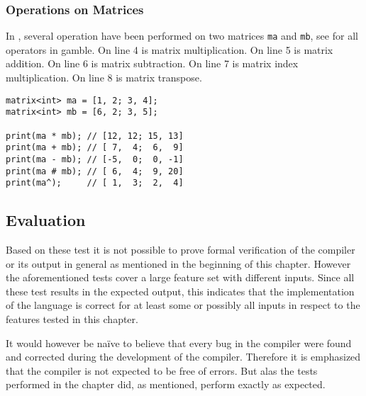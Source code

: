 \subsubsection*{Operations on Matrices}
In , several operation have been performed on two matrices \texttt{ma} and \texttt{mb}, see  for all operators in \gls{gamble}. 
On line 4 is matrix multiplication.
On line 5 is matrix addition.
On line 6 is matrix subtraction.
On line 7 is matrix index multiplication.
On line 8 is matrix transpose.
\begin{lstlisting}[caption={Matrix multiplication in \gls{gamble}.},label={lst:matrix1},frame=tb]
matrix<int> ma = [1, 2; 3, 4];
matrix<int> mb = [6, 2; 3, 5];

print(ma * mb); // [12, 12; 15, 13]
print(ma + mb); // [ 7,  4;  6,  9]
print(ma - mb); // [-5,  0;  0, -1]
print(ma # mb); // [ 6,  4;  9, 20]
print(ma^);     // [ 1,  3;  2,  4]
\end{lstlisting}



\subsection*{Evaluation}
Based on these test it is not possible to prove formal verification of the compiler or its output in general as mentioned in the beginning of this chapter.
However the aforementioned tests cover a large feature set with different inputs.
Since all these test results in the expected output, this indicates that the implementation of the language is correct for at least some or possibly all inputs in respect to the features tested in this chapter.

It would however be naïve to believe that every bug in the compiler were found and corrected during the development of the compiler.%
Therefore it is emphasized that the compiler is not expected to be free of errors. %
But alas the tests performed in the chapter did, as mentioned, perform exactly as expected. 